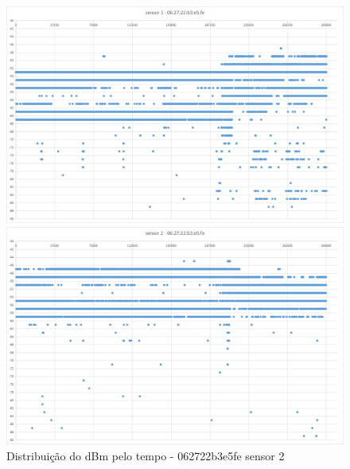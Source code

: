 \begin{figure}[htb]
\begin{minipage}{0.49\textwidth}
		\includegraphics[width=1\textwidth]{060-testes/data-analisis/night-run/062722b3e5fe-sensor-01.png}
	\end{minipage}
\hfill
	\begin{minipage}{0.49\textwidth}
	\centering
		\caption{\label{fig-062722b3e5fe-s2}Distribuição do dBm pelo tempo - 062722b3e5fe sensor 2}
		\includegraphics[width=1\textwidth]{060-testes/data-analisis/night-run/062722b3e5fe-sensor-02.png}
	\end{minipage}
\end{figure}

